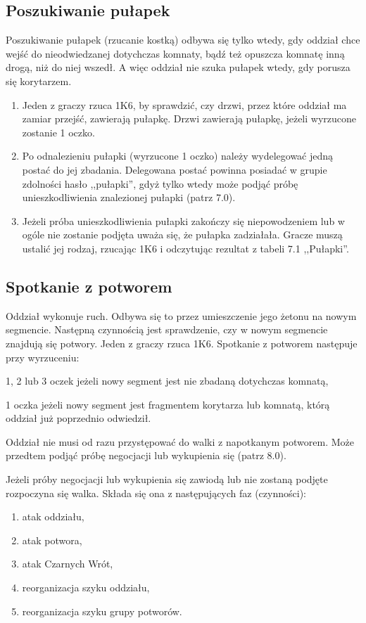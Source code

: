 \subsection{Poszukiwanie pułapek}
Poszukiwanie pułapek (rzucanie kostką) odbywa się tylko wtedy, gdy oddział chce wejść do nieodwiedzanej dotychczas komnaty, bądź też opuszcza komnatę inną drogą, niż do niej wszedł.
A więc oddział nie szuka pułapek wtedy, gdy porusza się korytarzem.
\begin{enumerate}
    \item
        Jeden z graczy rzuca 1K6, by sprawdzić, czy drzwi, przez które oddział ma zamiar przejść, zawierają pułapkę.
        Drzwi zawierają pułapkę, jeżeli wyrzucone zostanie 1 oczko.
    \item
        Po odnalezieniu pułapki (wyrzucone 1 oczko) należy wydelegować jedną postać do jej zbadania.
        Delegowana postać powinna posiadać w grupie zdolności hasło ,,pułapki'', gdyż tylko wtedy może podjąć próbę unieszkodliwienia znalezionej pułapki (patrz 7.0).
    \item
        Jeżeli próba unieszkodliwienia pułapki zakończy się niepowodzeniem lub w ogóle nie zostanie podjęta uważa się, że pułapka zadziałała.
        Gracze muszą ustalić jej rodzaj, rzucając 1K6 i odczytując rezultat z tabeli 7.1 ,,Pułapki''.
\end{enumerate}

\subsection{Spotkanie z potworem}
Oddział wykonuje ruch.
Odbywa się to przez umieszczenie jego żetonu na nowym segmencie.
Następną czynnością jest sprawdzenie, czy w nowym segmencie znajdują się potwory.
Jeden z graczy rzuca 1K6.
Spotkanie z potworem następuje przy wyrzuceniu:

1, 2 lub 3 oczek jeżeli nowy segment jest nie zbadaną dotychczas komnatą,

1 oczka jeżeli nowy segment jest fragmentem korytarza lub komnatą, którą oddział już poprzednio odwiedził.

Oddział nie musi od razu przystępować do walki z napotkanym potworem.
Może przedtem podjąć próbę negocjacji lub wykupienia się (patrz 8.0).

Jeżeli próby negocjacji lub wykupienia się zawiodą lub nie zostaną podjęte rozpoczyna się walka.
Składa się ona z następujących faz (czynności):
\begin{enumerate}
    \item
        atak oddziału,
    \item
        atak potwora,
    \item
        atak Czarnych Wrót,
    \item
        reorganizacja szyku oddziału,
    \item
        reorganizacja szyku grupy potworów.
\end{enumerate}

